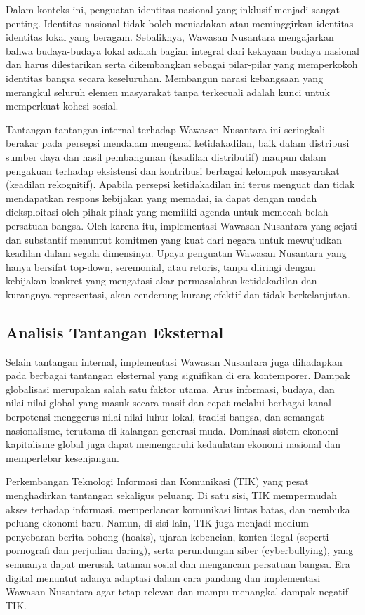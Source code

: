 \documentclass[12pt, a4paper]{article}
\begin{document}
Dalam konteks ini, penguatan identitas nasional yang inklusif menjadi sangat penting. Identitas nasional tidak boleh meniadakan atau meminggirkan identitas-identitas lokal yang beragam. Sebaliknya, Wawasan Nusantara mengajarkan bahwa budaya-budaya lokal adalah bagian integral dari kekayaan budaya nasional dan harus dilestarikan serta dikembangkan sebagai pilar-pilar yang memperkokoh identitas bangsa secara keseluruhan. Membangun narasi kebangsaan yang merangkul seluruh elemen masyarakat tanpa terkecuali adalah kunci untuk memperkuat kohesi sosial.  

Tantangan-tantangan internal terhadap Wawasan Nusantara ini seringkali berakar pada persepsi mendalam mengenai ketidakadilan, baik dalam distribusi sumber daya dan hasil pembangunan (keadilan distributif) maupun dalam pengakuan terhadap eksistensi dan kontribusi berbagai kelompok masyarakat (keadilan rekognitif). Apabila persepsi ketidakadilan ini terus menguat dan tidak mendapatkan respons kebijakan yang memadai, ia dapat dengan mudah dieksploitasi oleh pihak-pihak yang memiliki agenda untuk memecah belah persatuan bangsa. Oleh karena itu, implementasi Wawasan Nusantara yang sejati dan substantif menuntut komitmen yang kuat dari negara untuk mewujudkan keadilan dalam segala dimensinya. Upaya penguatan Wawasan Nusantara yang hanya bersifat top-down, seremonial, atau retoris, tanpa diiringi dengan kebijakan konkret yang mengatasi akar permasalahan ketidakadilan dan kurangnya representasi, akan cenderung kurang efektif dan tidak berkelanjutan.
\subsection*{Analisis Tantangan Eksternal}

Selain tantangan internal, implementasi Wawasan Nusantara juga dihadapkan pada berbagai tantangan eksternal yang signifikan di era kontemporer. Dampak globalisasi merupakan salah satu faktor utama. Arus informasi, budaya, dan nilai-nilai global yang masuk secara masif dan cepat melalui berbagai kanal berpotensi menggerus nilai-nilai luhur lokal, tradisi bangsa, dan semangat nasionalisme, terutama di kalangan generasi muda. Dominasi sistem ekonomi kapitalisme global juga dapat memengaruhi kedaulatan ekonomi nasional dan memperlebar kesenjangan.  

Perkembangan Teknologi Informasi dan Komunikasi (TIK) yang pesat menghadirkan tantangan sekaligus peluang. Di satu sisi, TIK mempermudah akses terhadap informasi, memperlancar komunikasi lintas batas, dan membuka peluang ekonomi baru. Namun, di sisi lain, TIK juga menjadi medium penyebaran berita bohong (hoaks), ujaran kebencian, konten ilegal (seperti pornografi dan perjudian daring), serta perundungan siber (cyberbullying), yang semuanya dapat merusak tatanan sosial dan mengancam persatuan bangsa. Era digital menuntut adanya adaptasi dalam cara pandang dan implementasi Wawasan Nusantara agar tetap relevan dan mampu menangkal dampak negatif TIK.  
\end{document}
